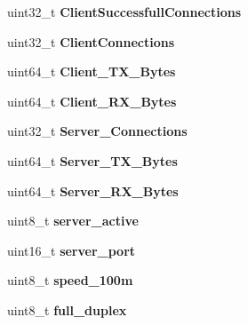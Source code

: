 \begin{DoxyCompactItemize}
\item 
\hypertarget{struct_t_m___e_t_h_e_r_n_e_t__t_ab3383aae5dca1ea00b2ef151f0feb994}{}uint32\+\_\+t {\bfseries Client\+Successfull\+Connections}\label{struct_t_m___e_t_h_e_r_n_e_t__t_ab3383aae5dca1ea00b2ef151f0feb994}

\item 
\hypertarget{struct_t_m___e_t_h_e_r_n_e_t__t_a71f23090453a773b0f5785572bd556a8}{}uint32\+\_\+t {\bfseries Client\+Connections}\label{struct_t_m___e_t_h_e_r_n_e_t__t_a71f23090453a773b0f5785572bd556a8}

\item 
\hypertarget{struct_t_m___e_t_h_e_r_n_e_t__t_ac5402fc676a4ef0ba084c35dead0c21b}{}uint64\+\_\+t {\bfseries Client\+\_\+\+T\+X\+\_\+\+Bytes}\label{struct_t_m___e_t_h_e_r_n_e_t__t_ac5402fc676a4ef0ba084c35dead0c21b}

\item 
\hypertarget{struct_t_m___e_t_h_e_r_n_e_t__t_adbb248f9844d6000064dd622679686a5}{}uint64\+\_\+t {\bfseries Client\+\_\+\+R\+X\+\_\+\+Bytes}\label{struct_t_m___e_t_h_e_r_n_e_t__t_adbb248f9844d6000064dd622679686a5}

\item 
\hypertarget{struct_t_m___e_t_h_e_r_n_e_t__t_a2b53d6d83803a20a20477f21ffadc619}{}uint32\+\_\+t {\bfseries Server\+\_\+\+Connections}\label{struct_t_m___e_t_h_e_r_n_e_t__t_a2b53d6d83803a20a20477f21ffadc619}

\item 
\hypertarget{struct_t_m___e_t_h_e_r_n_e_t__t_af6712a769c2ee43286d5bf93b7ebb116}{}uint64\+\_\+t {\bfseries Server\+\_\+\+T\+X\+\_\+\+Bytes}\label{struct_t_m___e_t_h_e_r_n_e_t__t_af6712a769c2ee43286d5bf93b7ebb116}

\item 
\hypertarget{struct_t_m___e_t_h_e_r_n_e_t__t_a3f22b3a5daabd7ec698a8a1853cee878}{}uint64\+\_\+t {\bfseries Server\+\_\+\+R\+X\+\_\+\+Bytes}\label{struct_t_m___e_t_h_e_r_n_e_t__t_a3f22b3a5daabd7ec698a8a1853cee878}

\item 
\hypertarget{struct_t_m___e_t_h_e_r_n_e_t__t_a1a29a0e62b5f164e55326db6b5f7ea9a}{}uint8\+\_\+t {\bfseries server\+\_\+active}\label{struct_t_m___e_t_h_e_r_n_e_t__t_a1a29a0e62b5f164e55326db6b5f7ea9a}

\item 
\hypertarget{struct_t_m___e_t_h_e_r_n_e_t__t_a6fb11f0475d51296a7e29f0ebb067080}{}uint16\+\_\+t {\bfseries server\+\_\+port}\label{struct_t_m___e_t_h_e_r_n_e_t__t_a6fb11f0475d51296a7e29f0ebb067080}

\item 
\hypertarget{struct_t_m___e_t_h_e_r_n_e_t__t_adc8b5a0421084d036bf442a3b9069674}{}uint8\+\_\+t {\bfseries speed\+\_\+100m}\label{struct_t_m___e_t_h_e_r_n_e_t__t_adc8b5a0421084d036bf442a3b9069674}

\item 
\hypertarget{struct_t_m___e_t_h_e_r_n_e_t__t_a22dec7f33c46618453cac5784e10f1c0}{}uint8\+\_\+t {\bfseries full\+\_\+duplex}\label{struct_t_m___e_t_h_e_r_n_e_t__t_a22dec7f33c46618453cac5784e10f1c0}

\end{DoxyCompactItemize}
